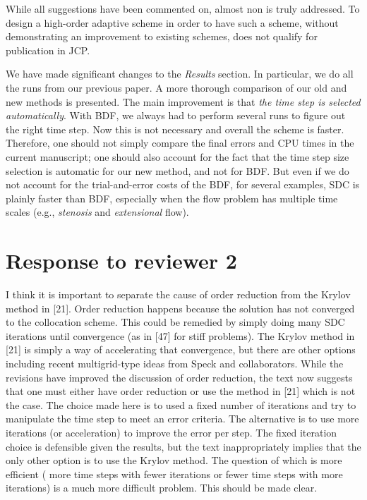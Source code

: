 \documentclass[12pt]{article}
\newcommand{\comment}[1]{{\color{blue} #1}}
\begin{document}
\comment{While all suggestions have been commented on, almost non is
truly addressed. To design a high-order adaptive scheme in order to
have such a scheme, without demonstrating an improvement to existing
schemes, does not qualify for publication in JCP.}

We have made significant changes to the {\em Results} section.  In
particular, we do all the runs from our previous paper.  A more
thorough comparison of our old and new methods is presented.  The main
improvement is that {\em the time step is selected automatically}. With
BDF, we always had to perform several runs to figure out the right time
step. Now this is not necessary and overall the scheme is faster.
Therefore, one should not simply compare the final errors and CPU times
in the current manuscript; one should also account for the fact that
the time step size selection is automatic for our new method, and not
for BDF. But even if we do not account for the trial-and-error costs of
the BDF, for several examples, SDC is plainly faster than BDF,
especially when the flow problem has multiple time scales (e.g., {\em
stenosis} and {\em extensional} flow).



\section*{Response to reviewer 2}
\comment{I think it is important to separate the cause of order
reduction from the Krylov method in [21]. Order reduction happens
because the solution has not converged to the collocation scheme. This
could be remedied by simply doing many SDC iterations until convergence
(as in [47] for stiff problems).  The Krylov method in [21] is simply a
way of accelerating that convergence, but there are other options
including recent multigrid-type ideas from Speck and collaborators.
While the revisions have improved the discussion of order reduction,
the text now suggests that one must either have order reduction or use
the method in [21] which is not the case. The choice made here is to
used a fixed number of iterations and try to manipulate the time step
to meet an error criteria. The alternative is to use more iterations
(or acceleration) to improve the error per step. The fixed iteration
choice is defensible given the results, but the text inappropriately
implies that the only other option is to use the Krylov method. The
question of which is more efficient ( more time steps with fewer
iterations or fewer time steps with more iterations) is a much more
difficult problem.  This should be made clear.}
\end{document}
